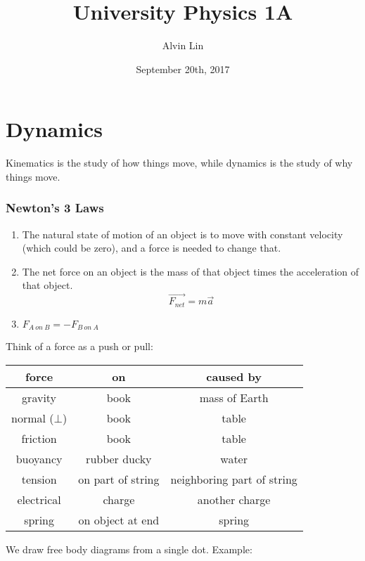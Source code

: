 \documentclass{math}
\title{University Physics 1A}
\author{Alvin Lin}
\date{September 20th, 2017}
\begin{document}
\maketitle

\section*{Dynamics}
Kinematics is the study of how things move, while dynamics is the study of why
things move.

\subsubsection*{Newton's 3 Laws}
\begin{enumerate}
  \item The natural state of motion of an object is to move with
    constant velocity (which could be zero), and a force is needed to
    change that.
  \item The net force on an object is the mass of that object times the
    acceleration of that object.
    \[ \overrightarrow{F_{net}} = m\vec{a} \]
  \item \( F_{A\ on\ B} = -F_{B\ on\ A} \)
\end{enumerate}
Think of a force as a push or pull:
\begin{center}
  \begin{tabular}{|c|c|c|}
    \hline
    \textbf{force} & \textbf{on} & \textbf{caused by} \\ \hline
    gravity & book & mass of Earth \\ \hline
    normal (\( \bot \)) & book & table \\ \hline
    friction & book & table \\ \hline
    buoyancy & rubber ducky & water \\ \hline
    tension & on part of string & neighboring part of string \\ \hline
    electrical & charge & another charge \\ \hline
    spring & on object at end & spring \\ \hline
  \end{tabular}
\end{center}

We draw free body diagrams from a single dot. Example:
\begin{center}
\end{center}
\end{document}
